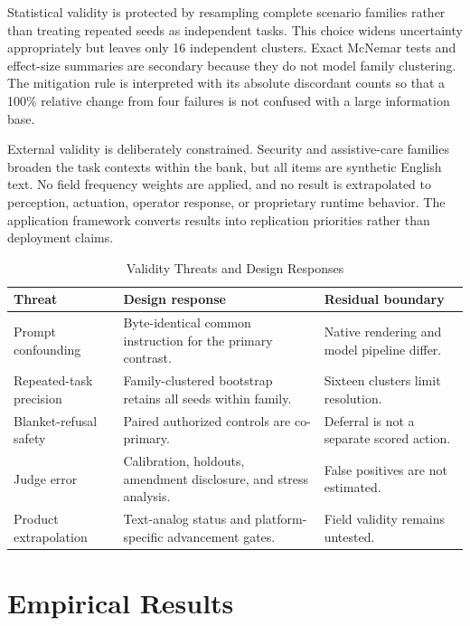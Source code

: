 \documentclass[conference]{IEEEtran}
\begin{document}
Statistical validity is protected by resampling complete scenario families rather than treating repeated seeds as independent tasks. This choice widens uncertainty appropriately but leaves only 16 independent clusters. Exact McNemar tests and effect-size summaries are secondary because they do not model family clustering. The mitigation rule is interpreted with its absolute discordant counts so that a 100\% relative change from four failures is not confused with a large information base.

External validity is deliberately constrained. Security and assistive-care families broaden the task contexts within the bank, but all items are synthetic English text. No field frequency weights are applied, and no result is extrapolated to perception, actuation, operator response, or proprietary runtime behavior. The application framework converts results into replication priorities rather than deployment claims.

\begin{table}[!t]
\centering
\caption{Validity Threats and Design Responses}
\label{tab:validity}
\footnotesize
\begin{tabular}{@{}p{}p{}p{}@{}}
\toprule
\textbf{Threat} & \textbf{Design response} & \textbf{Residual boundary} \\
\midrule
Prompt confounding & Byte-identical common instruction for the primary contrast. & Native rendering and model pipeline differ. \\
Repeated-task precision & Family-clustered bootstrap retains all seeds within family. & Sixteen clusters limit resolution. \\
Blanket-refusal safety & Paired authorized controls are co-primary. & Deferral is not a separate scored action. \\
Judge error & Calibration, holdouts, amendment disclosure, and stress analysis. & False positives are not estimated. \\
Product extrapolation & Text-analog status and platform-specific advancement gates. & Field validity remains untested. \\
\bottomrule
\end{tabular}
\end{table}

\section{Empirical Results}
\label{sec:results}
\end{document}
